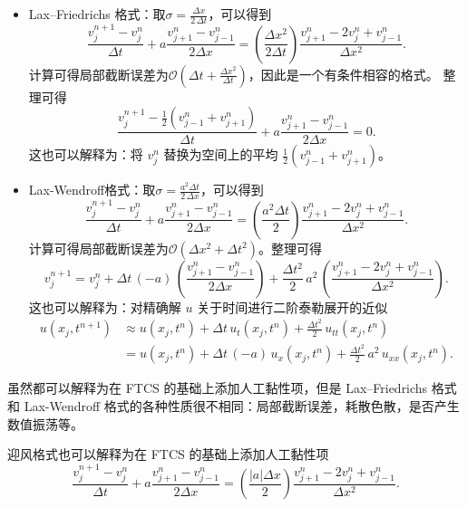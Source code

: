 \begin{itemize}
    \item[(a)] Lax–Friedrichs 格式：取$\sigma = \frac{\Delta x}{2\,\Delta t}$，可以得到
          \[
              \frac{v_j^{n+1}-v_j^n}{\Delta t} + a \frac{v_{j+1}^n-v_{j-1}^n}{2\Delta x} = \left(\frac{\Delta x^2}{2\Delta t}\right) \frac{v_{j+1}^n-2 v_j^n+v_{j-1}^n}{\Delta x^2}.
          \]
          计算可得局部截断误差为$\mathcal{O}(\Delta t + \frac{\Delta x^2}{\Delta t})$，因此是一个有条件相容的格式。
          整理可得
          \[
              \frac{v_j^{n+1}-\frac12(v_{j-1}^n+v_{j+1}^n)}{\Delta t} + a \frac{v_{j+1}^n-v_{j-1}^n}{2\Delta x} = 0.
          \]
          这也可以解释为：将 $v_j^n$ 替换为空间上的平均 $\frac12(v_{j-1}^{n} + v_{j+1}^{n})$。

    \item[(b)] Lax-Wendroff格式：取$\sigma = \frac{a^2 \Delta t}{2\,\Delta x}$，可以得到
          \[
              \frac{v_j^{n+1}-v_j^n}{\Delta t} + a \frac{v_{j+1}^n-v_{j-1}^n}{2\Delta x} = \left(\frac{a^2 \Delta t}{2}\right) \frac{v_{j+1}^n-2 v_j^n+v_{j-1}^n}{\Delta x^2}.
          \]
          计算可得局部截断误差为$\mathcal{O}(\Delta x^2+\Delta t^2)$。整理可得
          \[
              v_{j}^{n+1} = v_j^n + \Delta t \,(-a)\,\left(\frac{v_{j+1}^n- v_{j-1}^n}{2\Delta x}\right)
              + \frac{\Delta t^2}2\,a^2\,\left(\frac{v_{j+1}^n-2v_{j}^n+v_{j-1}^n}{\Delta x^2}\right).
          \]
          这也可以解释为：对精确解 $u$ 关于时间进行二阶泰勒展开的近似
          \begin{align*}
              u(x_j,t^{n+1})
               & \approx u(x_j,t^n) + \Delta t \,u_t(x_j,t^n) + \frac{\Delta t^2}2\,u_{tt}(x_j,t^n)      \\
               & = u(x_j,t^n) + \Delta t \,(-a)\,u_x(x_j,t^n) + \frac{\Delta t^2}2\,a^2\,u_{xx}(x_j,t^n).
          \end{align*}
\end{itemize}

\begin{remark}
    虽然都可以解释为在 FTCS 的基础上添加人工黏性项，但是 Lax–Friedrichs 格式和 Lax-Wendroff 格式的各种性质很不相同：局部截断误差，耗散色散，是否产生数值振荡等。
\end{remark}

\begin{remark}
    迎风格式也可以解释为在 FTCS 的基础上添加人工黏性项
    \[
        \frac{v_j^{n+1} - v_j^n}{\Delta t} + a \frac{v_{j+1}^n - v_{j-1}^{n}}{2\Delta x} = \left(\frac{|a| \Delta x}2\right) \frac{v_{j+1}^n - 2 v_j^n + v_{j-1}^{n}}{\Delta x^2}.
    \]
\end{remark}

